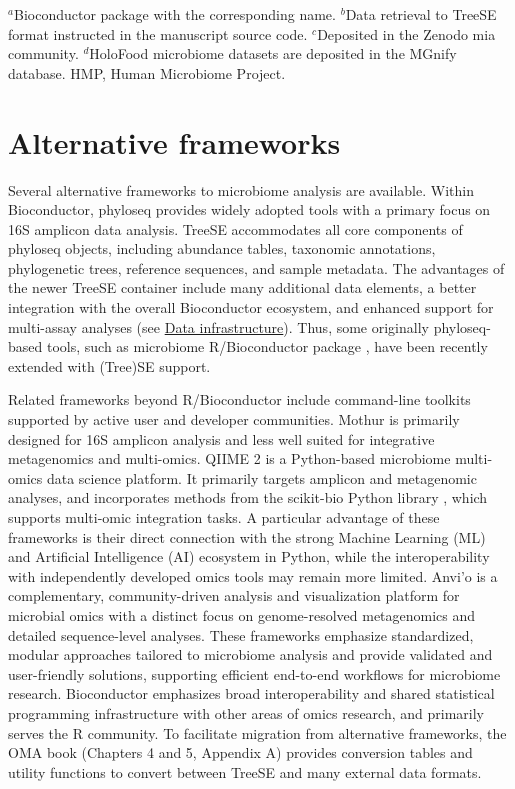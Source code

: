 \documentclass[
  sn-nature,
]{sn-jnl}
\begin{document}
\(^a\)Bioconductor package with the corresponding name. \(^b\)Data
retrieval to TreeSE format instructed in the manuscript source code.
\(^c\)Deposited in the Zenodo mia community. \(^d\)HoloFood microbiome
datasets are deposited in the MGnify database. HMP, Human Microbiome
Project.

\section{Alternative frameworks}\label{sec-data_frameworks}

Several alternative frameworks to microbiome analysis are available.
Within Bioconductor, phyloseq \citep{mcmurdie2012} provides widely
adopted tools with a primary focus on 16S amplicon data analysis. TreeSE
accommodates all core components of phyloseq objects, including
abundance tables, taxonomic annotations, phylogenetic trees, reference
sequences, and sample metadata. The advantages of the newer TreeSE
container \citep{huang2021} include many additional data elements, a
better integration with the overall Bioconductor ecosystem, and enhanced
support for multi-assay analyses (see \hyperref[sec-infra]{Data
infrastructure}). Thus, some originally phyloseq-based tools, such as
microbiome R/Bioconductor package \citep{shetty2019}, have been recently
extended with (Tree)SE support.

Related frameworks beyond R/Bioconductor include command-line toolkits
supported by active user and developer communities. Mothur
\citep{schloss2009} is primarily designed for 16S amplicon analysis and
less well suited for integrative metagenomics and multi-omics. QIIME 2
\citep{bolyen2019} is a Python-based microbiome multi-omics data science
platform. It primarily targets amplicon and metagenomic analyses, and
incorporates methods from the scikit-bio Python library
\citep{aton2026}, which supports multi-omic integration tasks. A
particular advantage of these frameworks is their direct connection with
the strong Machine Learning (ML) and Artificial Intelligence (AI)
ecosystem in Python, while the interoperability with independently
developed omics tools may remain more limited. Anvi'o \citep{eren2021}
is a complementary, community-driven analysis and visualization platform
for microbial omics with a distinct focus on genome-resolved
metagenomics and detailed sequence-level analyses. These frameworks
emphasize standardized, modular approaches tailored to microbiome
analysis and provide validated and user-friendly solutions, supporting
efficient end-to-end workflows for microbiome research. Bioconductor
emphasizes broad interoperability and shared statistical programming
infrastructure with other areas of omics research, and primarily serves
the R community. To facilitate migration from alternative frameworks,
the OMA book (Chapters 4 and 5, Appendix A) provides conversion tables
and utility functions to convert between TreeSE and many external data
formats.
\end{document}
